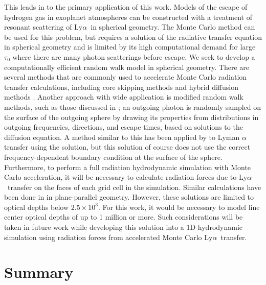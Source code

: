\documentclass{aastex63}
\newcommand\lya{Ly$\alpha$\ }
\begin{document}
This leads in to the primary application of this work. Models of the escape of hydrogen gas in exoplanet atmospheres can be constructed with a treatment of resonant scattering of \lya in spherical geometry. The Monte Carlo method can be used for this problem, but requires a solution of the radiative transfer equation in spherical geometry and is limited by its high computational demand for large $\tau_0$ where there are many photon scatterings before escape. We seek to develop a computationally efficient random walk model in spherical geometry. There are several methods that are commonly used to accelerate Monte Carlo radiation transfer calculations, including core skipping methods \citep{1968ApJ...153..783A,2002ApJ...567..922A} and hybrid diffusion methods \citep{2018MNRAS.479.2065S}. Another approach with wide application is modified random walk methods, such as those discussed in \citet{1984JCoPh..54..508F, 2009A&A...497..155M, 2010A&A...520A..70R}; an outgoing photon is randomly sampled on the surface of the outgoing sphere by drawing its properties from distributions in outgoing frequencies, directions, and escape times, based on solutions to the diffusion equation. A method similar to this has been applied by \citet{2006ApJ...645..792T} to Lyman $\alpha$ transfer using the \cite{1990ApJ...350..216N} solution, but this solution of course does not use the correct frequency-dependent boundary condition at the surface of the sphere. Furthermore, to perform a full radiation hydrodynamic simulation with Monte Carlo acceleration, it will be necessary to calculate radiation forces due to \lya transfer on the faces of each grid cell in the simulation. Similar calculations have been done in \citet{1976ApJ...208..286W} in plane-parallel geometry. However, these solutions are limited to optical depths below $2.5 \times 10^3$. For this work, it would be necessary to model line center optical depths of up to 1 million or more. Such considerations will be taken in future work while developing this solution into a 1D hydrodynamic simulation using radiation forces from accelerated Monte Carlo \lya transfer.

\section{Summary}
\end{document}
